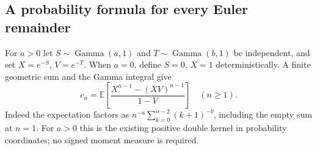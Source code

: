 \subsection{A probability formula for every Euler remainder}

For $a>0$ let $S\sim\operatorname{Gamma}(a,1)$ and
$T\sim\operatorname{Gamma}(b,1)$ be independent, and set
$X=e^{-S}$, $V=e^{-T}$. When $a=0$, define $S=0$, $X=1$
deterministically. A finite geometric sum and the Gamma integral give
\begin{equation}\label{newEuler:eq:moments}
 c_n=\mathbb E\!\left[
       \frac{X^{n-1}-(XV)^{n-1}}{1-V}\right]\quad(n\ge1).
\end{equation}
Indeed the expectation factors as
$n^{-a}\sum_{k=0}^{n-2}(k+1)^{-b}$, including the empty sum at
$n=1$. For $a>0$ this is the existing positive double kernel in
probability coordinates; no signed moment measure is required.

